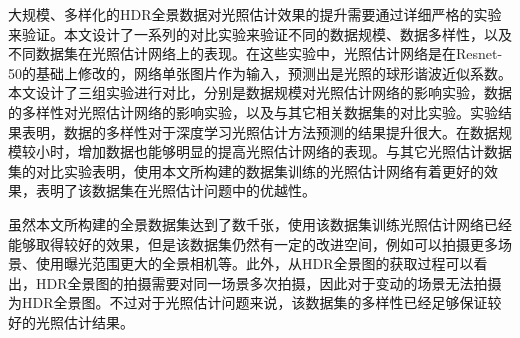 大规模、多样化的HDR全景数据对光照估计效果的提升需要通过详细严格的实验来验证。本文设计了一系列的对比实验来验证不同的数据规模、数据多样性，以及不同数据集在光照估计网络上的表现。在这些实验中，光照估计网络是在Resnet-50的基础上修改的，网络单张图片作为输入，预测出是光照的球形谐波近似系数。本文设计了三组实验进行对比，分别是数据规模对光照估计网络的影响实验，数据的多样性对光照估计网络的影响实验，以及与其它相关数据集的对比实验。实验结果表明，数据的多样性对于深度学习光照估计方法预测的结果提升很大。在数据规模较小时，增加数据也能够明显的提高光照估计网络的表现。与其它光照估计数据集的对比实验表明，使用本文所构建的数据集训练的光照估计网络有着更好的效果，表明了该数据集在光照估计问题中的优越性。

虽然本文所构建的全景数据集达到了数千张，使用该数据集训练光照估计网络已经能够取得较好的效果，但是该数据集仍然有一定的改进空间，例如可以拍摄更多场景、使用曝光范围更大的全景相机等。此外，从HDR全景图的获取过程可以看出，HDR全景图的拍摄需要对同一场景多次拍摄，因此对于变动的场景无法拍摄为HDR全景图。不过对于光照估计问题来说，该数据集的多样性已经足够保证较好的光照估计结果。